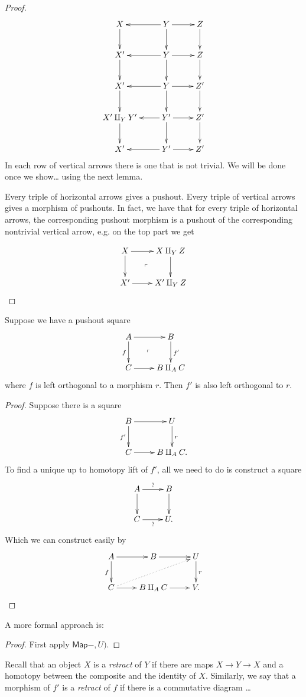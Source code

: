 \begin{proof}
$$
\xymatrix{
X\ar[d]&Y \ar[l]\ar[d]\ar[r]&Z\ar[d]\\
X'\ar[d]&  Y \ar[l]\ar[d]\ar[r]&Z\ar[d]\\
X' \ar[d]&  Y \ar[l]\ar[d]\ar[r]& Z'\ar[d]\\
X'\amalg_Y Y'\ar[d]&  Y'\ar[l]\ar[d]\ar[r]& Z'\ar[d]\\
X'& Y'\ar[l]\ar[r]&Z'
}
$$
In each row of vertical arrows there is one that
is not trivial. We will be done once we show… using
the next lemma.

Every triple of horizontal arrows gives a pushout.
Every triple of vertical arrows gives a morphism of pushouts.
In fact, we have that for every triple
of horizontal arrows, the corresponding pushout
morphism is a pushout of the corresponding nontrivial
vertical arrow, e.g. on the top part we get

$$
\xymatrix{
X\ar[r]\ar[d]\ar@{}[dr]|-{\ulcorner}&X \amalg_YZ\ar[d]\\
X'\ar[r]&X'\amalg_YZ
}
$$

\end{proof}

\begin{lemma}
\label{lemma-orthogonal-lemma2}
Suppose we have a pushout square
$$
\xymatrix{
A\ar[r]\ar[d]_f\ar@{}[dr]|-{\ulcorner}&B\ar[d]^{f'}\\
C\ar[r]&B \amalg_A C
}
$$
where $f$ is left orthogonal to a morphism $r$.
Then $f'$ is also left orthogonal to $r$.
\end{lemma}

\begin{proof}
Suppose there is a square
$$
\xymatrix{
B\ar[r]\ar[d]_{f'}&U\ar[d]^{r}\\
C\ar[r]&B \amalg_A C.
}
$$
To find a unique up to homotopy lift of $f'$, 
all we need to do is construct a square
$$
\xymatrix{
A\ar[r]^?\ar[d]&B\ar[d]\\
C\ar[r]_?&U.
}
$$
Which we can construct easily by
$$
\xymatrix{
A \ar[d]_f\ar[r]& B\ar[r]& U\ar[d]^r\\
C\ar@{.>}[urr]\ar[r]&  B \amalg_A C \ar[r]&V.
}
$$
\end{proof}

A more formal approach is:

\begin{proof}
First apply $\mathsf{Map}-,U)$.
\end{proof}

\begin{definition}
\label{definition-retract}
Recall that an object $X$ is a {\it retract} of $Y$ 
if there are maps $X \to Y \to X$ and 
a homotopy between the composite and the identity of $X$.
Similarly,
we say that a morphism of $f'$ is
a {\it retract} of $f$ if there is a commutative diagram
…
\end{definition}

